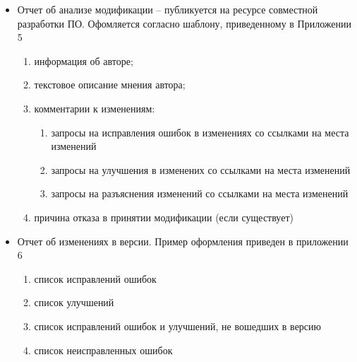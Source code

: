 \begin{itemize}
    \item Отчет об анализе модификации -- публикуется на ресурсе совместной разработки ПО.
    Офомляется согласно шаблону, приведенному в Приложении 5
    \begin{enumerate}
        \item информация об авторе;
        \item текстовое описание мнения автора;
        \item комментарии к изменениям:
        \begin{enumerate}
            \item запросы на исправления ошибок в изменениях со ссылками на места изменений
            \item запросы на улучшения в изменених со ссылками на места изменений
            \item запросы на разъяснения изменений со ссылками на места изменений
        \end{enumerate}
        \item причина отказа в принятии модификации (если существует)
    \end{enumerate}


    \item Отчет об изменениях в версии. Пример оформления приведен в приложении 6
    \begin{enumerate}
        \item список исправлений ошибок
        \item список улучшений
        \item список исправлений ошибок и улучшений, не вошедших в версию
        \item список неисправленных ошибок
    \end{enumerate}
\end{itemize}

